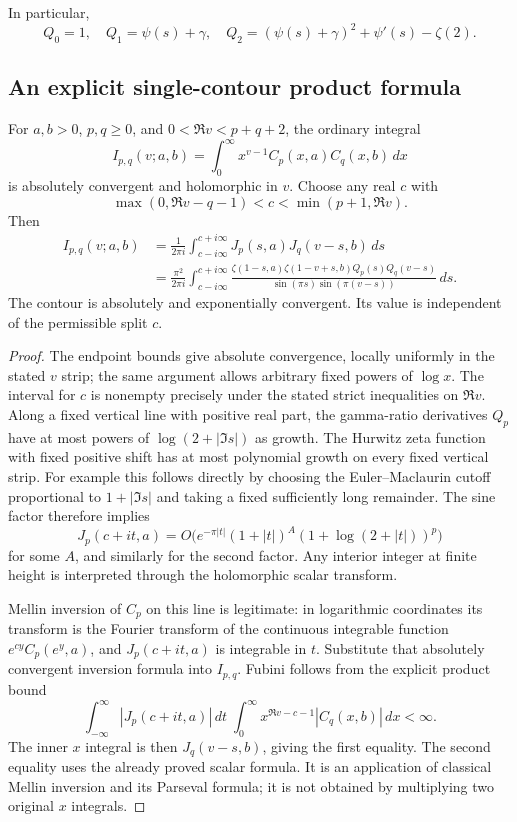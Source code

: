In particular,
\[
 Q_0=1,\quad Q_1=\psi(s)+\gamma,\quad
 Q_2=(\psi(s)+\gamma)^2+\psi'(s)-\zeta(2).
\]

\subsection{An explicit single-contour product formula}

\begin{theorem}\label{stbil:barnes}
For $a,b>0$, $p,q\geq0$, and $0<\Re v<p+q+2$, the ordinary integral
\[
 I_{p,q}(v;a,b)=\int_0^\infty x^{v-1}C_p(x,a)C_q(x,b)\,dx
\]
is absolutely convergent and holomorphic in $v$.  Choose any real $c$ with
\[
 \max(0,\Re v-q-1)<c<\min(p+1,\Re v).
\]
Then
\begin{align*}
 I_{p,q}(v;a,b)
 &=\frac1{2\pi i}\int_{c-i\infty}^{c+i\infty}
       J_p(s,a)J_q(v-s,b)\,ds\\
 &=\frac{\pi^2}{2\pi i}\int_{c-i\infty}^{c+i\infty}
 \frac{\zeta(1-s,a)\zeta(1-v+s,b)Q_p(s)Q_q(v-s)}
      {\sin(\pi s)\sin(\pi(v-s))}\,ds.
\end{align*}
The contour is absolutely and exponentially convergent.  Its value is
independent of the permissible split $c$.
\end{theorem}

\begin{proof}
The endpoint bounds give absolute convergence, locally uniformly in the
stated $v$ strip; the same argument allows arbitrary fixed powers of
$\log x$.  The interval for $c$ is nonempty precisely under the stated
strict inequalities on $\Re v$.  Along a fixed vertical line with positive
real part, the gamma-ratio derivatives $Q_p$ have at most powers of
$\log(2+|\Im s|)$ as growth.  The Hurwitz zeta function with fixed positive
shift has at most polynomial growth on every fixed vertical strip.  For
example this follows directly by choosing the Euler--Maclaurin cutoff
proportional to $1+|\Im s|$ and taking a fixed sufficiently long remainder.
The sine factor therefore implies
\[
 J_p(c+it,a)=O\bigl(e^{-\pi|t|}(1+|t|)^A
                         (1+\log(2+|t|))^p\bigr)
\]
for some $A$, and similarly for the second factor.  Any interior integer
at finite height is interpreted through the holomorphic scalar transform.

Mellin inversion of $C_p$ on this line is legitimate: in logarithmic
coordinates its transform is the Fourier transform of the continuous
integrable function $e^{cy}C_p(e^y,a)$, and $J_p(c+it,a)$ is integrable in
$t$.  Substitute that absolutely convergent inversion formula into
$I_{p,q}$.  Fubini follows from the explicit product bound
\[
 \int_{-\infty}^{\infty}|J_p(c+it,a)|\,dt\;
 \int_0^\infty x^{\Re v-c-1}|C_q(x,b)|\,dx<\infty.
\]
The inner $x$ integral is then $J_q(v-s,b)$, giving the first equality.
The second equality uses the already proved scalar formula.  It is an
application of classical Mellin inversion and its Parseval formula;
it is not obtained by multiplying two original $x$ integrals.
\end{proof}

